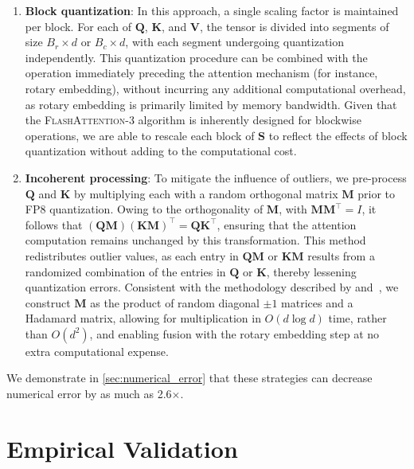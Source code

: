 \begin{enumerate}

\item \textbf{Block quantization}: In this approach, a single scaling factor is maintained per block. For each of $\mathbf{Q}$, $\mathbf{K}$, and $\mathbf{V}$, the tensor is divided into segments of size $B_r \times d$ or $B_c \times d$, with each segment undergoing quantization independently. This quantization procedure can be combined with the operation immediately preceding the attention mechanism (for instance, rotary embedding), without incurring any additional computational overhead, as rotary embedding is primarily limited by memory bandwidth. Given that the \textsc{FlashAttention-3} algorithm is inherently designed for blockwise operations, we are able to rescale each block of $\mathbf{S}$ to reflect the effects of block quantization without adding to the computational cost.

\item \textbf{Incoherent processing}: To mitigate the influence of outliers, we pre-process $\mathbf{Q}$ and $\mathbf{K}$ by multiplying each with a random orthogonal matrix $\mathbf{M}$ prior to FP8 quantization. Owing to the orthogonality of $\mathbf{M}$, with $\mathbf{M} \mathbf{M}^\top = I$, it follows that $(\mathbf{Q} \mathbf{M}) (\mathbf{K} \mathbf{M})^\top = \mathbf{Q} \mathbf{K}^\top$, ensuring that the attention computation remains unchanged by this transformation. This method redistributes outlier values, as each entry in $\mathbf{Q} \mathbf{M}$ or $\mathbf{K} \mathbf{M}$ results from a randomized combination of the entries in $\mathbf{Q}$ or $\mathbf{K}$, thereby lessening quantization errors. Consistent with the methodology described by \citet{chee2024quip} and~\citet{tseng2024quip}, we construct $\mathbf{M}$ as the product of random diagonal $\pm 1$ matrices and a Hadamard matrix, allowing for multiplication in $O(d \log d)$ time, rather than $O(d^2)$, and enabling fusion with the rotary embedding step at no extra computational expense.

\end{enumerate}

We demonstrate in \cref{sec:numerical_error} that these strategies can decrease numerical error by as much as 2.6$\times$.

\section{Empirical Validation}
\label{sec:exp}

